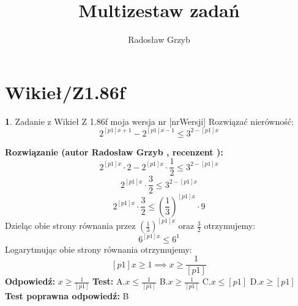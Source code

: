 \documentclass[12pt, a4paper]{article}
\title{Multizestaw zadań}
\author{Radosław Grzyb}
\date{}
\theoremstyle{definition} %
\newtheorem{zad}{}
\newcommand{\kategoria}[1]{\section{#1}} %
\newcommand{\zadStart}[1]{\begin{zad}#1\newline} %
\newcommand{\zadStop}{\end{zad}}   %
\newcommand{\rozwStart}[2]{\noindent \textbf{Rozwiązanie (autor #1 , recenzent #2): }\newline} %
\newcommand{\rozwStop}{\newline}                                            %
\newcommand{\odpStart}{\noindent \textbf{Odpowiedź:}\newline}    %
\newcommand{\odpStop}{\newline}                                             %
\newcommand{\testStart}{\noindent \textbf{Test:}\newline} %
\newcommand{\testStop}{\newline} %
\newcommand{\kluczStart}{\noindent \textbf{Test poprawna odpowiedź:}\newline} %
\newcommand{\kluczStop}{\newline} %
\begin{document}
\maketitle
\kategoria{Wikieł/Z1.86f}
\zadStart{Zadanie z Wikieł Z 1.86f moja wersja nr [nrWersji]}
Rozwiązać nierówność:
$$2^{[p1]x+1}-2^{[p1]x-1}\leq3^{2-[p1]x}$$
\zadStop
\rozwStart{Radosław Grzyb}{}
$$2^{[p1]x}\cdot2-2^{[p1]x}\cdot\frac{1}{2}\leq3^{2-[p1]x}$$
$$2^{[p1]x}\cdot\frac{3}{2}\leq3^{2-[p1]x}$$
$$2^{[p1]x}\cdot\frac{3}{2}\leq\left(\frac{1}{3}\right)^{[p1]x}\cdot9$$
Dzieląc obie strony równania przez $\left(\frac{1}{3}\right)^{[p1]x}$ oraz $\frac{3}{2}$ otrzymujemy:
$$6^{[p1]x}\leq6^{1}$$
Logarytmując obie strony równania otrzymujemy:
$$[p1]x\geq1 \implies x\geq\frac{1}{[p1]}$$
\rozwStop
\odpStart
$x\geq\frac{1}{[p1]}$
\odpStop
\testStart
A.$x\leq\frac{1}{[p1]}$
B.$x\geq\frac{1}{[p1]}$
C.$x \leq [p1]$
D.$x \geq [p1]$
\testStop
\kluczStart
B
\kluczStop
\end{document}
